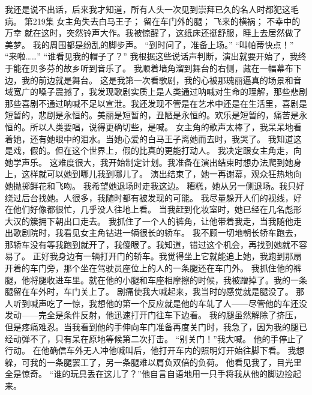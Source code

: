 \documentclass[a4paper,12pt,UTF8,twoside]{ctexbook}
\begin{document}
        我还是说不出话，后来我才知道，所有人头一次见到崇拜已久的名人时都犯这毛病。   第219集 
        女主角失去白马王子； 
        留在车门外的腿； 
        飞来的横祸； 
        不幸中的万幸   
        就在这时，突然铃声大作。我被惊醒了，这纸床还挺舒服，睡上去居然做了美梦。 
        我的周围都是纷乱的脚步声。 
        “到时问了，准备上场。” 
        “叫帕蒂快点！” 
        “来啦……” 
        “谁看见我的帽子了？” 
        我根据这些说话声判断，演出就要开始了，我终于能在贝多芬的故乡听到音乐了。 
        我顺着墙角溜到舞台的右侧，藏在一幅幕布下边，我的前边就是舞台。 
        这是我第一次看歌剧，我的心被那瑰丽逼真的场景和音域宽广的嗓子震撼了，我发现歌剧实质上是人类通过呐喊对生命的理解，那些悲剧那些喜剧不通过呐喊不足以宣泄。我还发现不管是在艺术中还是在生活里，喜剧是短暂的，悲剧是永恒的。美丽是短暂的，丑陋是永恒的。欢乐是短暂的，痛苦是永恒的。所以人类要唱，说得更确切些，是喊。 
        女主角的歌声太棒了，我呆呆地看着她，还有她眼中的泪水。当她心爱的白马王子离她而去时，我哭了。 
        我知道这是戏，假的。但在这个世界上，假的比真的更能打动人。 
        我决定跟女主角走，向她学声乐。 
        这难度很大，我开始制定计划。我准备在演出结束时想办法爬到她身上，这样就可以她到哪儿我到哪儿了。 
        演出结束了，她一再谢幕，观众狂热地向她抛掷鲜花和飞吻。 
        我希望她退场时走我这边。 
        糟糕，她从另一侧退场。我只好绕过后台找她。人很多，我随时都有被发现的可能。 
        我尽量躲开人们的视线，好在他们好像都很忙，几乎没人往地上看。 
        当我赶到化妆室时，她已经在几名彪形大汉的簇拥下朝出口走去。 
        我抓住了一个人的裤角，让他带着我走，当我随他走出歌剧院时，我看见女主角钻进一辆很长的轿车。 
        我不顾一切地朝长轿车跑去，那轿车没有等我跑到就开了，我傻眼了。我知道，错过这个机会，再找到她就不容易了。 
        正好我身边有一辆打开门的轿车。我觉得坐上它就能追上她，我跑到那扇开着的车门旁，那个坐在驾驶员座位上的人的一条腿还在车门外。 
        我抓住他的裤腿，他将腿收进车里。就在他的小腿和车座相摩擦的时候，我被蹭掉了。我的一条腿留在车外时，车门关上了。 
        剧痛使我大喊起来，我当时的感觉就是腿没了。 
        那人听到喊声吃了一惊，我想他的第一个反应就是他的车轧了人——尽管他的车还没发动——完全是条件反射，他迅速打开门往车下边看。 
        我的腿虽然解除了挤压，但是疼痛难忍。当我看到他的手伸向车门准备再度关门时，我急了，因为我的腿已经动弹不了，只有呆在原地等候第二次打击。 
        “别关门！”我大喊。 
        他的手停止了行动。 
        在他确信车外无人冲他喊叫后，他打开车内的照明灯开始往脚下看。 
        我想躲，可我的一条腿罢工了，另一条腿难以肩负双倍的负荷。 
        他看见我了，目光里全是惊奇。 
        “谁的玩具丢在这儿了？”他自言自语地用一只手将我从他的脚边捡起来。 
\end{document}
